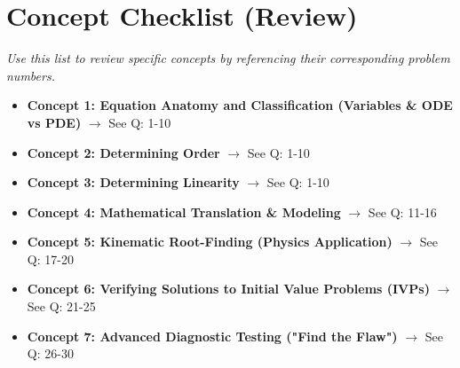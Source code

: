 \documentclass{article}
\begin{document}
\newpage

\section{Concept Checklist (Review)}
\textit{Use this list to review specific concepts by referencing their corresponding problem numbers.}

\begin{itemize}
    \item \textbf{Concept 1: Equation Anatomy and Classification (Variables \& ODE vs PDE)} $\rightarrow$ See Q: 1-10
    \item \textbf{Concept 2: Determining Order} $\rightarrow$ See Q: 1-10
    \item \textbf{Concept 3: Determining Linearity} $\rightarrow$ See Q: 1-10
    \item \textbf{Concept 4: Mathematical Translation \& Modeling} $\rightarrow$ See Q: 11-16
    \item \textbf{Concept 5: Kinematic Root-Finding (Physics Application)} $\rightarrow$ See Q: 17-20
    \item \textbf{Concept 6: Verifying Solutions to Initial Value Problems (IVPs)} $\rightarrow$ See Q: 21-25
    \item \textbf{Concept 7: Advanced Diagnostic Testing ("Find the Flaw")} $\rightarrow$ See Q: 26-30
\end{itemize}
\end{document}
